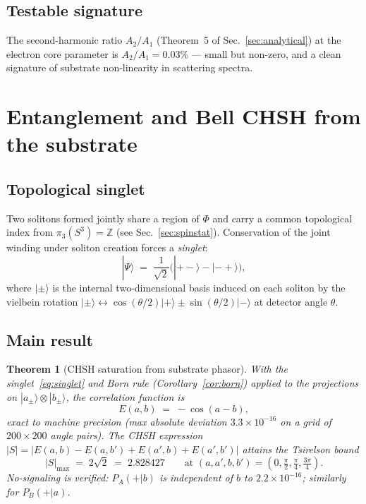 \documentclass[11pt,a4paper]{article}
\renewcommand{\Phi}{\varPhi}
\newcommand{\pithreeS}{\pi_{3}(S^{3})}
\newtheorem{theorem}{Theorem}
\begin{document}
\subsection{Testable signature}

The second-harmonic ratio $A_{2}/A_{1}$ (Theorem~5 of
Sec.~\ref{sec:analytical}) at the electron core parameter is
$A_{2}/A_{1}=0.03\%$ --- small but non-zero, and a clean signature of
substrate non-linearity in scattering spectra.

\section{Entanglement and Bell CHSH from the substrate}\label{sec:entanglement}

\subsection{Topological singlet}

Two solitons formed jointly share a region of $\Phi$ and carry a
common topological index from $\pithreeS=\mathbb{Z}$
(see Sec.~\ref{sec:spinstat}). Conservation of the joint winding
under soliton creation forces a \emph{singlet}:
\begin{equation}\label{eq:singlet}
  |\Psi\rangle \;=\;
    \frac{1}{\sqrt{2}}\bigl(|{+-}\rangle-|{-+}\rangle\bigr),
\end{equation}
where $|\pm\rangle$ is the internal two-dimensional basis induced on
each soliton by the vielbein rotation
$|\pm\rangle\leftrightarrow\cos(\theta/2)|+\rangle\pm\sin(\theta/2)|-\rangle$
at detector angle $\theta$.

\subsection{Main result}

\begin{theorem}[CHSH saturation from substrate phasor]\label{thm:chsh}
With the singlet~\eqref{eq:singlet} and Born rule
(Corollary~\ref{cor:born}) applied to the projections on
$|a_{\pm}\rangle\otimes|b_{\pm}\rangle$,
the correlation function is
\begin{equation}\label{eq:correlation}
  E(a,b) \;=\; -\cos(a-b),
\end{equation}
exact to machine precision (max absolute deviation
$3.3\times 10^{-16}$ on a grid of $200\times 200$ angle pairs).
The CHSH expression
$|S| = |E(a,b)-E(a,b')+E(a',b)+E(a',b')|$
attains the Tsirelson bound
\begin{equation}\label{eq:tsirelson}
  |S|_{\max} \;=\; 2\sqrt{2} \;=\; 2.828427
  \qquad \text{at } (a,a',b,b')=(0,\tfrac{\pi}{2},\tfrac{\pi}{4},\tfrac{3\pi}{4}).
\end{equation}
No-signaling is verified: $P_{A}(+|b)$ is independent of $b$ to
$2.2\times 10^{-16}$; similarly for $P_{B}(+|a)$.
\end{theorem}
\end{document}
